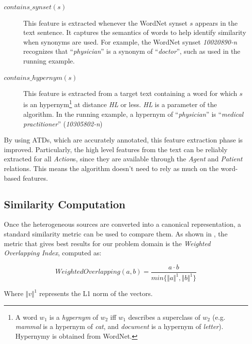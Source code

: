 \begin{description}
       \item[$contains\_synset(s)$]{This feature is extracted whenever the
           WordNet synset $s$ appears in the text sentence. It captures the
           semantics of words to help identify similarity when synonyms are
           used. For example, the WordNet synset \textit{10020890-n} recognizes
           that ``\textit{physician}'' is a synonym of ``\textit{doctor}'',
           such as used in the running example.}

       \item[$contains\_hypernym(s)$]{This feature is extracted from a target
           text containing a word for which $s$ is an hypernym\footnote{A word
             $w_1$ is a \textit{hypernym} of $w_2$ iff $w_1$ describes a
             superclass of $w_2$ (e.g. \textit{mammal} is a hypernym of
             \textit{cat}, and \textit{document} is a hypernym of
             \textit{letter}). Hypernymy is obtained from WordNet.} at distance
           \emph{HL} or less. \emph{HL} is a parameter of the algorithm. In the
           running example, a hypernym of ``\textit{physician}'' is
           ``\textit{medical practitioner}'' (\textit{10305802-n})}
\end{description}

By using ATDs, which are accurately annotated, this feature extraction phase is
improved. Particularly, the high level features from the text can be reliably
extracted for all \emph{Action}s, since they are available through the
\emph{Agent} and \emph{Patient} relations. This means the algorithm doesn't need
to rely as much on the word-based features.

\subsection{Similarity Computation}

Once the heterogeneous sources are converted into a canonical representation, a
standard similarity metric can be used to compare them. As shown in
\cite{10.1007/978-3-319-59536-8_26}, the metric that gives best results for our
problem domain is the \emph{Weighted Overlapping Index}, computed as:

\begin{equation}
  WeightedOverlapping(a, b) = \frac{a \cdot b}{min\{\Vert a \Vert^1, \Vert b \Vert^1\}}
\end{equation}

Where $\Vert v \Vert^1$ represents the L1 norm of the vectors.

